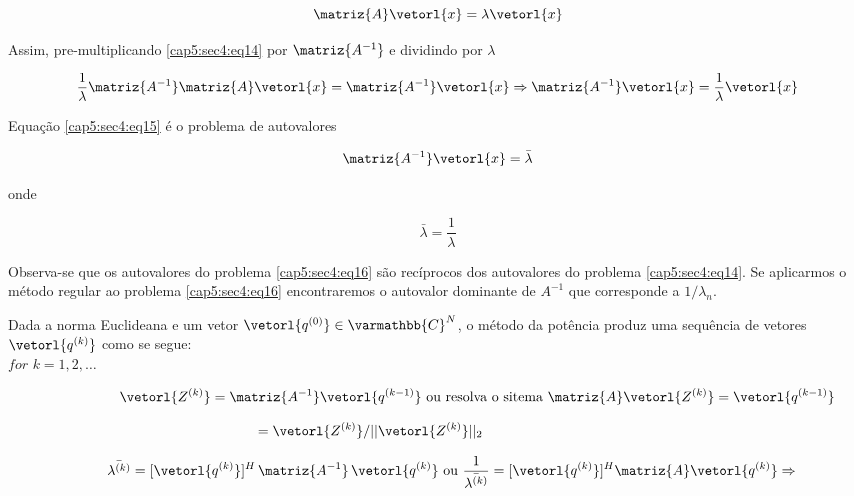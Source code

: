 \begin{equation}
 \label{cap5:sec4:eq14}
 \matriz{A} \vetorl{x} = \lambda \vetorl{x}
\end{equation}

Assim, pre-multiplicando \ref{cap5:sec4:eq14} por $ \matriz{A^{-1}} $ e dividindo por $ \lambda $

\begin{equation}
 \label{cap5:sec4:eq15}
 \frac{1}{\lambda} \matriz{A^{-1}} \matriz{A} \vetorl{x} = \matriz{A^{-1}} \vetorl{x}
 \Rightarrow
 \matriz{A^{-1}} \vetorl{x} = \frac{1}{\lambda} \vetorl{x}
\end{equation}

Equação \ref{cap5:sec4:eq15} é o problema de autovalores

\begin{equation}
 \label{cap5:sec4:eq16}
 \matriz{A^{-1}} \vetorl{x} = \bar{\lambda}
\end{equation}

onde

\begin{equation}
 \bar{\lambda} = \frac{1}{\lambda}
\end{equation}

Observa-se que os autovalores do problema \ref{cap5:sec4:eq16} são recíprocos dos autovalores do problema \ref{cap5:sec4:eq14}. Se aplicarmos o método regular ao problema \ref{cap5:sec4:eq16} encontraremos o autovalor dominante de $ A^{-1} $ que corresponde a $ 1/\lambda_n $.

Dada a norma Euclideana e um vetor $ \vetorl{q^{(0)}} \in \varmathbb{C}^N $, o método da potência produz uma sequência de vetores $ \vetorl{q^{(k)}} $ como se segue:\\

\hspace*{1cm}
$
for \, \, k = 1, 2, \ldots
$

\begin{equation}
 \hspace*{2cm}
 \vetorl{Z^{(k)}} = \matriz{A^{-1}} \vetorl{q^{(k-1)}}
 \, \, \mbox{ou resolva o sitema}
 \, \, \matriz{A} \vetorl{Z^{(k)}}
 = \vetorl{q^{(k-1)}}
\end{equation}

\begin{equation}
 \hspace*{-5.7cm}
 \vetorl{q^{(k)}} = \vetorl{Z^{(k)}} / || \vetorl{Z^{(k)}} ||_2
\end{equation}


\[
 \hspace*{0.7cm}
 \bar{\lambda^{(k)}} = [\vetorl{q^{(k)}}]^H \, \matriz{A^{-1}} \, \vetorl{q^{(k)}}
 \, \, \mbox{ou}
 \, \, \frac{1}{\bar{\lambda^{(k)}}} = [\vetorl{q^{(k)}}]^H \matriz{A} \vetorl{q^{(k)}} \Rightarrow
\]

